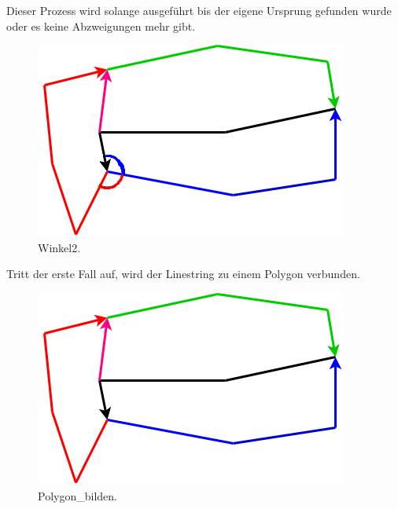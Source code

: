 \documentclass[a4paper, 12pt]{article}
\begin{document}
 Dieser Prozess wird solange ausgeführt bis der eigene Ursprung gefunden wurde oder es keine Abzweigungen mehr gibt. 
\begin{figure}[H]
  \includegraphics[scale=0.7]{Dokumentation/2.png}
  \caption{Winkel2.}
  \label{fig:Winkel2}
\end{figure}
Tritt der erste Fall auf, wird der Linestring zu einem Polygon verbunden.
\begin{figure}[H]
  \includegraphics[scale=0.7]{Dokumentation/Polygon_bilden1.png}
  \caption{Polygon_bilden.}
  \label{fig:Polygon_bilden}
\end{figure}
\end{document}
